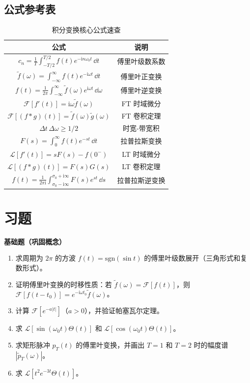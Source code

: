 \subsection*{公式参考表}

\begin{table}[h]
\centering
\caption{积分变换核心公式速查}
\label{tab:transform_formulas}
\begin{tabular}{c|c}
\toprule
公式 & 说明 \\
\midrule
$c_n = \frac{1}{T}\int_{-T/2}^{T/2} f(t)e^{-\mathrm{i}n\omega_0 t}\,\dd t$ & 傅里叶级数系数 \\
$\tilde{f}(\omega) = \int_{-\infty}^{\infty} f(t)e^{-\mathrm{i}\omega t}\,\dd t$ & 傅里叶正变换 \\
$f(t) = \frac{1}{2\pi}\int_{-\infty}^{\infty} \tilde{f}(\omega)e^{\mathrm{i}\omega t}\,\dd\omega$ & 傅里叶逆变换 \\
$\mathcal{F}[f'(t)] = \mathrm{i}\omega\tilde{f}(\omega)$ & FT 时域微分 \\
$\mathcal{F}[(f*g)(t)] = \tilde{f}(\omega)\tilde{g}(\omega)$ & FT 卷积定理 \\
$\Delta t\,\Delta\omega \geq 1/2$ & 时宽-带宽积 \\
$F(s) = \int_0^{\infty} f(t)e^{-st}\,\dd t$ & 拉普拉斯变换 \\
$\mathcal{L}[f'(t)] = sF(s) - f(0^-)$ & LT 时域微分 \\
$\mathcal{L}[(f*g)(t)] = F(s)G(s)$ & LT 卷积定理 \\
$f(t) = \frac{1}{2\pi\mathrm{i}}\int_{\sigma_0-\mathrm{i}\infty}^{\sigma_0+\mathrm{i}\infty} F(s)e^{st}\,\dd s$ & 拉普拉斯逆变换 \\
\bottomrule
\end{tabular}
\end{table}

\section*{习题}

\textbf{基础题（巩固概念）}

\begin{enumerate}
\item 求周期为 $2\pi$ 的方波 $f(t) = \mathrm{sgn}(\sin t)$ 的傅里叶级数展开（三角形式和复数形式）。
\item 证明傅里叶变换的时移性质：若 $\tilde{f}(\omega) = \mathcal{F}[f(t)]$，则 $\mathcal{F}[f(t-t_0)] = e^{-\mathrm{i}\omega t_0}\tilde{f}(\omega)$。
\item 计算 $\mathcal{F}[e^{-a|t|}]$（$a>0$），并验证帕塞瓦尔定理。
\item 求 $\mathcal{L}[\sin(\omega_0 t)\Theta(t)]$ 和 $\mathcal{L}[\cos(\omega_0 t)\Theta(t)]$。
\item 求矩形脉冲 $p_T(t)$ 的傅里叶变换，并画出 $T=1$ 和 $T=2$ 时的幅度谱 $|\tilde{p}_T(\omega)|$。
\item 求 $\mathcal{L}[t^2 e^{-3t}\Theta(t)]$。
\end{enumerate}

